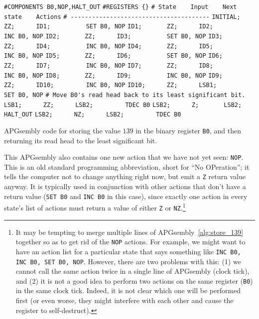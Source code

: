 \begin{apgsembly}
	\begin{algorithmic}\small
		\State \verb|#COMPONENTS B0,NOP,HALT_OUT|
		\State \verb|#REGISTERS {}|
		\State \verb|# State    Input    Next state    Actions|
		\State \verb|# ---------------------------------------|
		\State \verb|INITIAL;   ZZ;      ID1;          SET B0, NOP|
		\State \verb|ID1;       ZZ;      ID2;          INC B0, NOP|
		\State \verb|ID2;       ZZ;      ID3;          SET B0, NOP|
		\State \verb|ID3;       ZZ;      ID4;          INC B0, NOP|
		\State \verb|ID4;       ZZ;      ID5;          INC B0, NOP|
		\State \verb|ID5;       ZZ;      ID6;          SET B0, NOP|
		\State \verb|ID6;       ZZ;      ID7;          INC B0, NOP|
		\State \verb|ID7;       ZZ;      ID8;          INC B0, NOP|
		\State \verb|ID8;       ZZ;      ID9;          INC B0, NOP|
		\State \verb|ID9;       ZZ;      ID10;         INC B0, NOP|
		\State \verb|ID10;      ZZ;      LSB1;         SET B0, NOP|
		\State
		\State \verb|# Move B0's read head back to its least significant bit.|
		\State \verb|LSB1;      ZZ;      LSB2;         TDEC B0|
		\State \verb|LSB2;      Z;       LSB2;         HALT_OUT|
		\State \verb|LSB2;      NZ;      LSB2;         TDEC B0|
	\end{algorithmic}
	\caption{APGsembly code for storing the value $139$ in the binary register \texttt{B0}, and then returning its read head to the least significant bit.}\label{alg:store_139}
\end{apgsembly}

This APGsembly also contains one new action that we have not yet seen: \texttt{NOP}. This is an old standard programming abbreviation, short for ``No OPeration''; it tells the computer not to change anything right now, but emit a \texttt{Z} return value anyway. It is typically used in conjunction with other actions that don't have a return value (\texttt{SET B0} and \texttt{INC B0} in this case), since exactly one action in every state's list of actions must return a value of either \texttt{Z} or \texttt{NZ}.\footnote{It may be tempting to merge multiple lines of APGsembly~\ref{alg:store_139} together so as to get rid of the \texttt{NOP} actions. For example, we might want to have an action list for a particular state that says something like \texttt{INC B0, INC B0, SET B0, NOP}. However, there are two problems with this: (1) we cannot call the same action twice in a single line of APGsembly (clock tick), and (2) it is not a good idea to perform two actions on the same register (\texttt{B0}) in the same clock tick. Indeed, it is not clear which one will be performed first (or even worse, they might interfere with each other and cause the register to self-destruct).}


